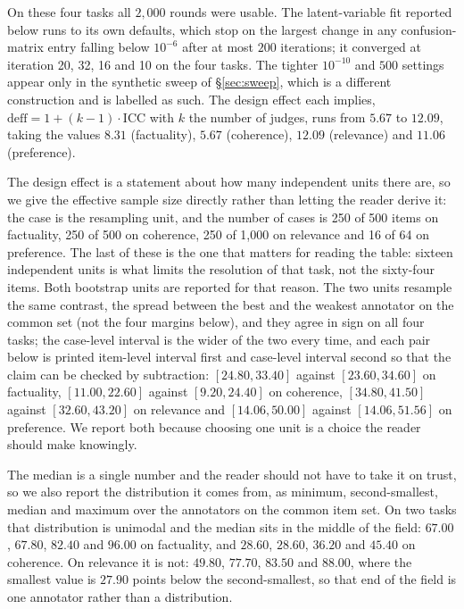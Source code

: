 \documentclass{article}
\begin{document}
On these four tasks all $2{,}000$ rounds were usable. The latent-variable fit reported below runs to its own defaults, which stop on the largest change in any confusion-matrix entry falling below $10^{-6}$ after at most $200$ iterations; it converged at iteration 20, 32, 16 and 10 on the four tasks. The tighter $10^{-10}$ and $500$ settings appear only in the synthetic sweep of \S\ref{sec:sweep}, which is a different construction and is labelled as such. The design effect each implies, $\mathrm{deff} = 1 + (k-1)\cdot\mathrm{ICC}$ with $k$ the number of judges, runs from $5.67$ to $12.09$, taking the values $8.31$ (factuality), $5.67$ (coherence), $12.09$ (relevance) and $11.06$ (preference).

The design effect is a statement about how many independent units there are, so we give the effective sample size directly rather than letting the reader derive it: the case is the resampling unit, and the number of cases is 250 of 500 items on factuality, 250 of 500 on coherence, 250 of 1,000 on relevance and 16 of 64 on preference. The last of these is the one that matters for reading the table: sixteen independent units is what limits the resolution of that task, not the sixty-four items. Both bootstrap units are reported for that reason. The two units resample the same contrast, the spread between the best and the weakest annotator on the common set (not the four margins below), and they agree in sign on all four tasks; the case-level interval is the wider of the two every time, and each pair below is printed item-level interval first and case-level interval second so that the claim can be checked by subtraction: $[24.80, 33.40]$ against $[23.60, 34.60]$ on factuality, $[11.00, 22.60]$ against $[9.20, 24.40]$ on coherence, $[34.80, 41.50]$ against $[32.60, 43.20]$ on relevance and $[14.06, 50.00]$ against $[14.06, 51.56]$ on preference. We report both because choosing one unit is a choice the reader should make knowingly.

The median is a single number and the reader should not have to take it on trust, so we also report the distribution it comes from, as minimum, second-smallest, median and maximum over the annotators on the common item set. On two tasks that distribution is unimodal and the median sits in the middle of the field: $67.00$, $67.80$, $82.40$ and $96.00$ on factuality, and $28.60$, $28.60$, $36.20$ and $45.40$ on coherence. On relevance it is not: $49.80$, $77.70$, $83.50$ and $88.00$, where the smallest value is $27.90$ points below the second-smallest, so that end of the field is one annotator rather than a distribution.
\end{document}

